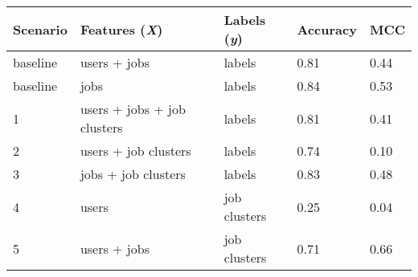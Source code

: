 \begin{tabular}{lllll}
\toprule
\textbf{Scenario}   & \textbf{Features (\textit{X})}    & \textbf{Labels (\textit{y})}  & \textbf{Accuracy} & \textbf{MCC}        \\
\midrule
baseline            & users + jobs                      & labels                        & 0.81              & 0.44            \\
baseline            & jobs                              & labels                        & 0.84              & 0.53            \\
\midrule
1                   & users + jobs + job clusters       & labels                        & 0.81              & 0.41            \\ %
2                   & users + job clusters              & labels                        & 0.74              & 0.10            \\ %
3                   & jobs + job clusters               & labels                        & 0.83              & 0.48            \\ %
4                   & users                             & job clusters                  & 0.25              & 0.04            \\ %
5                   & users + jobs                      & job clusters                  & 0.71              & 0.66            \\ %
\bottomrule
\end{tabular}
